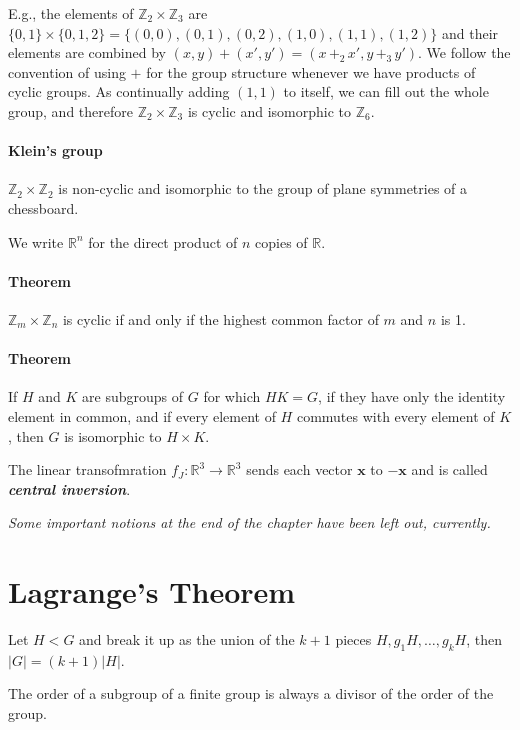 \documentclass[a4paper,twocolumn,10pt]{article}
\begin{document}
  E.g., the elements of $\mathbb{Z}_2 \times \mathbb{Z}_3$ are
  $\{0,1\}\times\{0,1,2\} = \{(0,0), (0,1), (0,2), (1,0), (1,1), (1,2)\}$ and
  their elements are combined by $(x,y) + (x',y') = (x \,+_2\, x', y \,+_3\, y')$.
  We follow the convention of using $+$ for the group structure whenever we
  have products of cyclic groups. As continually adding $(1,1)$ to itself, we
  can fill out the whole group, and therefore $\mathbb{Z}_2 \times
  \mathbb{Z}_3$ is cyclic and isomorphic to $\mathbb{Z}_6$.

  \paragraph{Klein's group} $\mathbb{Z}_2 \times \mathbb{Z}_2$ is non-cyclic
  and isomorphic to the group of plane symmetries of a chessboard.

  We write $\mathbb{R}^n$ for the direct product of $n$ copies of $\mathbb{R}$.

  \paragraph{Theorem } $\mathbb{Z}_m \times \mathbb{Z}_n$ is
  cyclic if and only if the highest common factor of $m$ and $n$ is 1.

  \paragraph{Theorem } If $H$ and $K$ are subgroups of $G$ for
  which $HK=G$, if they have only the identity element in common, and if every
  element of $H$ commutes with every element of $K$, then $G$ is isomorphic to
  $H \times K$.

  The linear transofmration $f_J\colon \mathbb{R}^3 \rightarrow \mathbb{R}^3$
  sends each vector $\bm{x}$ to $\bm{-x}$ and is called
  \textbf{\textit{central inversion}}.

  \textit{Some important notions at the end of the chapter have been left out,
  currently.}

  \section{Lagrange's Theorem}
  Let $H<G$ and break it up as the union of the $k+1$ pieces $H, g_1H, \ldots,
  g_kH$, then $|G|=(k+1)|H|$.

   The order of a subgroup of a finite group is always a divisor
  of the order of the group.
\end{document}
